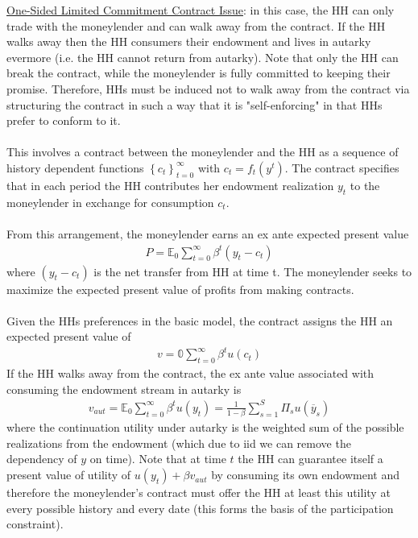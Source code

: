 \documentclass{article}
\begin{document}
\vspace{2.5mm}
\par \underline{One-Sided Limited Commitment Contract Issue}: in this case, the HH can only trade with the moneylender and can walk away from the contract. If the HH walks away then the HH consumers their endowment and lives in autarky evermore (i.e. the HH cannot return from autarky). Note that only the HH can break the contract, while the moneylender is fully committed to keeping their promise. Therefore, HHs must be induced not to walk away from the contract via structuring the contract in such a way that it is "self-enforcing" in that HHs prefer to conform to it. \\ \\
This involves a contract between the moneylender and the HH as a sequence of history dependent functions $\left\{c_{t}\right\}_{t=0}^{\infty}$ with $c_{t} = f_{t} (y^{t})$. The contract specifies that in each period the HH contributes her endowment realization $y_{t}$ to the moneylender in exchange for consumption $c_{t}$. \\ \\
From this arrangement, the moneylender earns an ex ante expected present value
\begin{gather*}
    P = \mathbb{E}_{0} \sum_{t=0}^{\infty} \beta^{t} (y_{t} - c_{t})
\end{gather*}
where $(y_{t} - c_{t})$ is the net transfer from HH at time t. The moneylender seeks to maximize the expected present value of profits from making contracts. \\ \\
Given the HHs preferences in the basic model, the contract assigns the HH an expected present value of
\begin{gather*}
    v = \mathbb{0} \sum_{t=0}^{\infty} \beta^{t} u(c_{t})
\end{gather*}
If the HH walks away from the contract, the ex ante value associated with consuming the endowment stream in autarky is
\begin{gather*}
    v_{aut} = \mathbb{E}_{0} \sum_{t=0}^{\infty} \beta^{t} u(y_{t}) = \frac{1}{1-\beta} \sum_{s=1}^{S} \Pi_{s} u(\overline{y}_{s})
\end{gather*}
where the continuation utility under autarky is the weighted sum of the possible realizations from the endowment (which due to iid we can remove the dependency of $y$ on time). Note that at time $t$ the HH can guarantee itself a present value of utility of $u(y_{t}) + \beta v_{aut}$ by consuming its own endowment and therefore the moneylender's contract must offer the HH at least this utility at every possible history and every date (this forms the basis of the participation constraint). \\ \\
\end{document}
